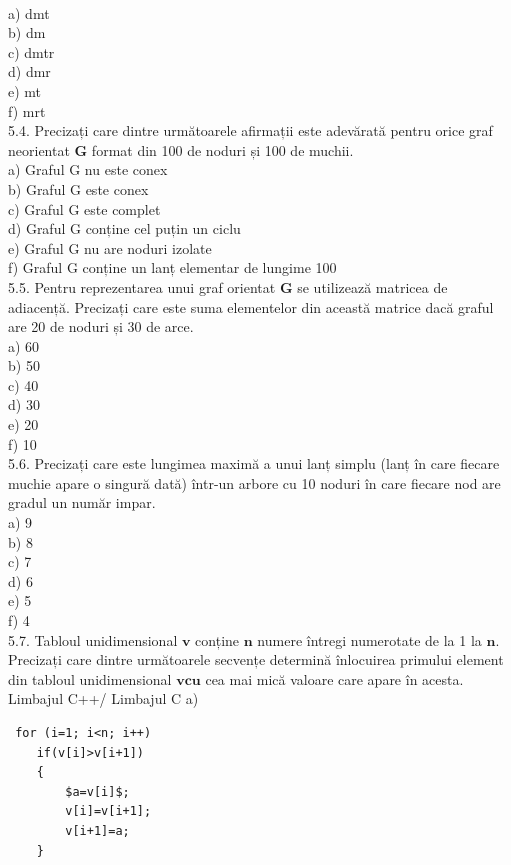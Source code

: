 \\
a) dmt
\\
b) dm
\\
c) dmtr
\\
d) dmr
\\
e) mt
\\
f) mrt
\\
5.4. Precizați care dintre următoarele afirmații este adevărată pentru orice graf neorientat $\mathbf{G}$ format din 100 de noduri și 100 de muchii.
\\
a) Graful G nu este conex
\\
b) Graful G este conex
\\
c) Graful G este complet
\\
d) Graful G conține cel puțin un ciclu
\\
e) Graful G nu are noduri izolate
\\
f) Graful G conține un lanț elementar de lungime 100
\\
5.5. Pentru reprezentarea unui graf orientat $\mathbf{G}$ se utilizează matricea de adiacență. Precizați care este suma elementelor din această matrice dacă graful are 20 de noduri și 30 de arce.
\\
a) 60
\\
b) 50
\\
c) 40
\\
d) 30
\\
e) 20
\\
f) 10
\\
5.6. Precizați care este lungimea maximă a unui lanț simplu (lanț în care fiecare muchie apare o singură dată) într-un arbore cu 10 noduri în care fiecare nod are gradul un număr impar.
\\
a) 9
\\
b) 8
\\
c) 7
\\
d) 6
\\
e) 5
\\
f) 4
\\
5.7. Tabloul unidimensional $\mathbf{v}$ conține $\mathbf{n}$ numere întregi numerotate de la 1 la $\mathbf{n}$. Precizați care dintre următoarele secvențe determină înlocuirea primului element din tabloul unidimensional $\mathbf{v} \mathbf{c u}$ cea mai mică valoare care apare în acesta.
\\
Limbajul C++/ Limbajul C
a) \begin{verbatim}
 for (i=1; i<n; i++)
    if(v[i]>v[i+1])
    {
        $a=v[i]$;
        v[i]=v[i+1];
        v[i+1]=a;
    }
\end{verbatim}
